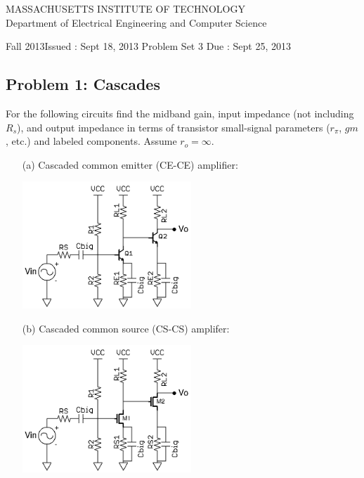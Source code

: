 \documentclass[11pt,twoside]{article}
\newlength{\toppush}
\newcommand{\htitle}[3]{\begin{center}
\vspace*{-\toppush}
{\large MASSACHUSETTS INSTITUTE OF TECHNOLOGY}\\
{\small Department of Electrical Engineering and Computer Science}\\
\vspace*{1ex}{\Large #2}\end{center}
\noindent
\newline\parbox{6.5in}
{Fall 2013\hfill Issued : #1 \newline
 Problem Set 3 \hfill Due : #3\newline
}}
\newcommand{\handout}[3]{\thispagestyle{empty}
\pagestyle{myheadings}\htitle{#1}{#2}{#3}}
\begin{document}
\handout{Sept 18, 2013}{6.301 Solid State Circuits}{Sept 25, 2013}
\setlength{\parindent}{0pt}

\newcommand{\solution}{
 \medskip
 {\bf Solution:}
}

\hrulefill

\flushleft

\subsection*{Problem 1: Cascades}
	For the following circuits find the midband gain, input impedance (not including $R_s$), and output impedance in terms of transistor small-signal parameters ($r_\pi$, $gm$, etc.) and labeled components. Assume $r_o=\infty$.
\begin{enumerate}
	\item[(a)] Cascaded common emitter (CE-CE) amplifier:

\begin{center}
\includegraphics[width=0.5\textwidth]{ce-ce.png}
\end{center}
	\item[(b)] Cascaded common source (CS-CS) amplifer:
\begin{center}
\includegraphics[width=0.5\textwidth]{cs-cs.png}
\end{center}
\end{enumerate}
\clearpage
\end{document}
